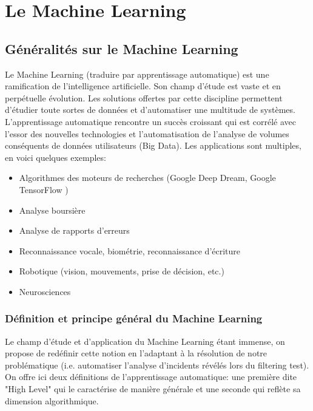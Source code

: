\chapter{ Le  Machine Learning}
\label{Le Machine Learning}
\thispagestyle{fancy}




\section{Généralités sur le Machine Learning}
\label{Le Machine Learning: Généralités sur le Machine Learning}
Le Machine Learning (traduire par apprentissage automatique) est une ramification de l'intelligence artificielle. Son champ d'étude est vaste et en perpétuelle évolution. Les solutions offertes par cette discipline permettent d'étudier toute sortes de données et d'automatiser une multitude de systèmes. L'apprentissage automatique rencontre un succès croissant qui est corrélé avec l'essor des nouvelles technologies et l'automatisation de l'analyse de volumes conséquents de données utilisateurs (Big Data). Les applications sont multiples, en voici quelques exemples:  

\begin{itemize}
	\item Algorithmes des moteurs de recherches (Google Deep Dream, Google TensorFlow \cite{NaoTech})
	\item Analyse boursière
	\item Analyse de rapports d'erreurs
	\item Reconnaissance vocale, biométrie, reconnaissance d'écriture
	\item Robotique (vision, mouvements, prise de décision, etc.)
	\item Neurosciences 
\end{itemize}



\subsection{Définition et principe général du Machine Learning}
\label{Le Machine Learning: Généralités sur le Machine Learning: Définition et principe général}
Le champ d'étude et d'application du Machine Learning étant immense, on propose de redéfinir cette notion en l'adaptant à la résolution de notre problématique (i.e. automatiser l'analyse d'incidents révélés lors du filtering test).
On offre ici deux définitions de l'apprentissage automatique: une première dite "High Level" qui le caractérise de manière générale et une seconde qui reflète sa dimension algorithmique. 

